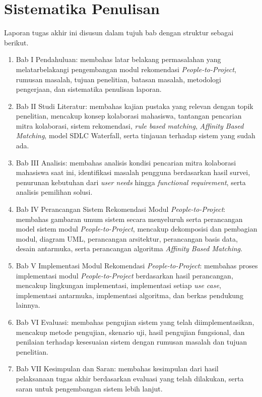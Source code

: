 \section{Sistematika Penulisan}

Laporan tugas akhir ini disusun dalam tujuh bab dengan struktur sebagai berikut.

\begin{enumerate}
\item Bab I Pendahuluan: membahas latar belakang permasalahan yang melatarbelakangi pengembangan modul rekomendasi \emph{People-to-Project}, rumusan masalah, tujuan penelitian, batasan masalah, metodologi pengerjaan, dan sistematika penulisan laporan.
\item Bab II Studi Literatur: membahas kajian pustaka yang relevan dengan topik penelitian, mencakup konsep kolaborasi mahasiswa, tantangan pencarian mitra kolaborasi, sistem rekomendasi, \emph{rule based matching}, \emph{Affinity Based Matching}, model SDLC Waterfall, serta tinjauan terhadap sistem yang sudah ada.
\item Bab III Analisis: membahas analisis kondisi pencarian mitra kolaborasi mahasiswa saat ini, identifikasi masalah pengguna berdasarkan hasil survei, penurunan kebutuhan dari \emph{user needs} hingga \emph{functional requirement}, serta analisis pemilihan solusi.
\item Bab IV Perancangan Sistem Rekomendasi Modul \emph{People-to-Project}: membahas gambaran umum sistem secara menyeluruh serta perancangan model sistem modul \emph{People-to-Project}, mencakup dekomposisi dan pembagian modul, diagram UML, perancangan arsitektur, perancangan basis data, desain antarmuka, serta perancangan algoritma \emph{Affinity Based Matching}.
\item Bab V Implementasi Modul Rekomendasi \emph{People-to-Project}: membahas proses implementasi modul \emph{People-to-Project} berdasarkan hasil perancangan, mencakup lingkungan implementasi, implementasi setiap \emph{use case}, implementasi antarmuka, implementasi algoritma, dan berkas pendukung lainnya.
\item Bab VI Evaluasi: membahas pengujian sistem yang telah diimplementasikan, mencakup metode pengujian, skenario uji, hasil pengujian fungsional, dan penilaian terhadap kesesuaian sistem dengan rumusan masalah dan tujuan penelitian.
\item Bab VII Kesimpulan dan Saran: membahas kesimpulan dari hasil pelaksanaan tugas akhir berdasarkan evaluasi yang telah dilakukan, serta saran untuk pengembangan sistem lebih lanjut.
\end{enumerate}
